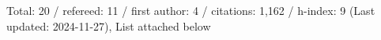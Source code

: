 Total: 20 / refereed: 11 / first author: 4 / citations: 1,162 / h-index: 9 (Last updated: 2024-11-27), List attached below